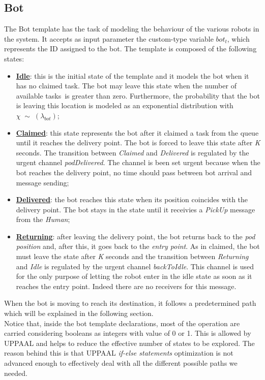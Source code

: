 \documentclass{article}
\begin{document}
		
		\subsection{Bot}
			The Bot template has the task of modeling the behaviour of the various robots in the system. It accepts as input parameter the custom-type variable $bot_t$, which represents the ID assigned to the bot. The template is composed of the following states:
			\begin{itemize}
				\item \textbf{\underline{Idle}}: this is the initial state of the template and it models the bot when it has no claimed task. The bot may leave this state when the number of available tasks\footnotemark\ is greater than zero. Furthermore, the probability that the bot is leaving this location is modeled as an exponential distribution with $\chi\;\sim\;(\lambda_{bot})$;
				\item \textbf{\underline{Claimed}}: this state represents the bot after it claimed a task from the queue until it reaches the delivery point. The bot is forced to leave this state after \emph{K} seconds. The transition between \emph{Claimed} and \emph{Delivered} is regulated by the urgent channel \emph{podDelivered}. The channel is been set urgent because when the bot reaches the delivery point, no time should pass between bot arrival and message sending;
				\item \textbf{\underline{Delivered}}: the bot reaches this state when its position coincides with the delivery point. The bot stays in the state until it receivies a \emph{PickUp} message from the \emph{Human};
				\item \textbf{\underline{Returning}}: after leaving the delivery point, the bot returns back to the \emph{pod position} and, after this, it goes back to the \emph{entry point}. As in claimed, the bot must leave the state after \emph{K} seconds and the transition between \emph{Returning} and \emph{Idle} is regulated by the urgent channel \emph{backToIdle}. This channel is used for the only purpose of letting the robot enter in the idle state as soon as it reaches the entry point. Indeed there are no receivers for this message.
			\end{itemize}
			When the bot is moving to reach its destination, it follows a predetermined path which will be explained in the following section.\\
			Notice that, inside the bot template declarations, most of the operation are carried considering booleans as integers with value of 0 or 1. This is allowed by UPPAAL and helps to reduce the effective number of states to be explored. The reason behind this is that UPPAAL \emph{if-else statements} optimization is not advanced enough to effectively deal with all the different possible paths we needed. 
			
\end{document}
